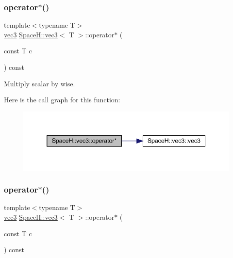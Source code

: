 \subsubsection{\texorpdfstring{operator$\ast$()}{operator*()}\hspace{0.1cm}{\footnotesize\ttfamily [6/7]}}
{\footnotesize\ttfamily template$<$typename T$>$ \\
\mbox{\hyperlink{struct_space_h_1_1vec3}{vec3}} \mbox{\hyperlink{struct_space_h_1_1vec3}{Space\+H\+::vec3}}$<$ T $>$\+::operator$\ast$ (\begin{DoxyParamCaption}\item[{const T}]{c }\end{DoxyParamCaption}) const\hspace{0.3cm}{\ttfamily [inline]}}



Multiply scalar by wise. 

Here is the call graph for this function\+:
\nopagebreak
\begin{figure}[H]
\begin{center}
\leavevmode
\includegraphics[width=346pt]{struct_space_h_1_1vec3_adb9a23774fc263d23487bdc6d2e253ce_cgraph}
\end{center}
\end{figure}
\mbox{\label{struct_space_h_1_1vec3_adb9a23774fc263d23487bdc6d2e253ce}} 
\subsubsection{\texorpdfstring{operator$\ast$()}{operator*()}\hspace{0.1cm}{\footnotesize\ttfamily [7/7]}}
{\footnotesize\ttfamily template$<$typename T$>$ \\
\mbox{\hyperlink{struct_space_h_1_1vec3}{vec3}} \mbox{\hyperlink{struct_space_h_1_1vec3}{Space\+H\+::vec3}}$<$ T $>$\+::operator$\ast$ (\begin{DoxyParamCaption}\item[{const T}]{c }\end{DoxyParamCaption}) const\hspace{0.3cm}{\ttfamily [inline]}}



